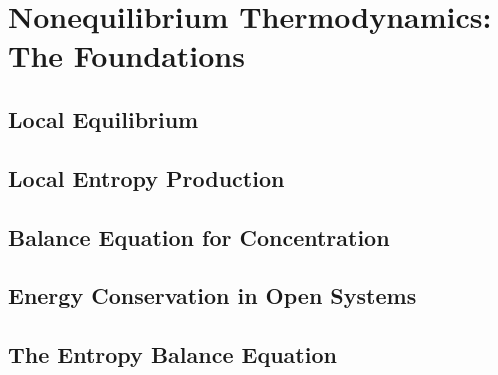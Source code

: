 \chapter{Nonequilibrium Thermodynamics: The Foundations}
\section{Local Equilibrium}
\section{Local Entropy Production}
\section{Balance Equation for Concentration}
\section{Energy Conservation in Open Systems}
\section{The Entropy Balance Equation}
